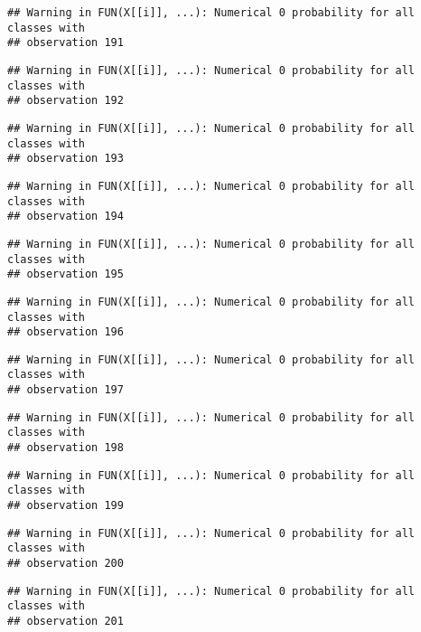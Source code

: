 \documentclass[
]{article}
\begin{document}
\begin{verbatim}
## Warning in FUN(X[[i]], ...): Numerical 0 probability for all classes with
## observation 191
\end{verbatim}

\begin{verbatim}
## Warning in FUN(X[[i]], ...): Numerical 0 probability for all classes with
## observation 192
\end{verbatim}

\begin{verbatim}
## Warning in FUN(X[[i]], ...): Numerical 0 probability for all classes with
## observation 193
\end{verbatim}

\begin{verbatim}
## Warning in FUN(X[[i]], ...): Numerical 0 probability for all classes with
## observation 194
\end{verbatim}

\begin{verbatim}
## Warning in FUN(X[[i]], ...): Numerical 0 probability for all classes with
## observation 195
\end{verbatim}

\begin{verbatim}
## Warning in FUN(X[[i]], ...): Numerical 0 probability for all classes with
## observation 196
\end{verbatim}

\begin{verbatim}
## Warning in FUN(X[[i]], ...): Numerical 0 probability for all classes with
## observation 197
\end{verbatim}

\begin{verbatim}
## Warning in FUN(X[[i]], ...): Numerical 0 probability for all classes with
## observation 198
\end{verbatim}

\begin{verbatim}
## Warning in FUN(X[[i]], ...): Numerical 0 probability for all classes with
## observation 199
\end{verbatim}

\begin{verbatim}
## Warning in FUN(X[[i]], ...): Numerical 0 probability for all classes with
## observation 200
\end{verbatim}

\begin{verbatim}
## Warning in FUN(X[[i]], ...): Numerical 0 probability for all classes with
## observation 201
\end{verbatim}
\end{document}
